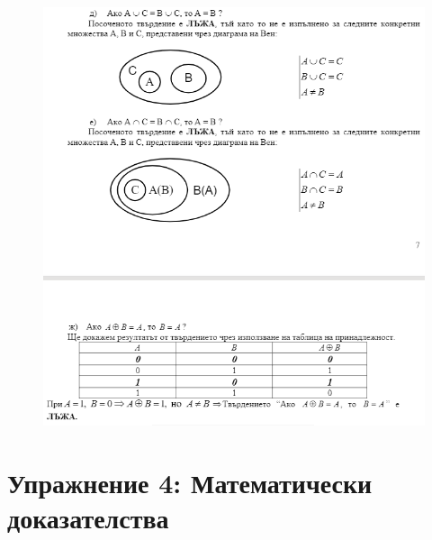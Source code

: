 \documentclass[fleqn, 12pt]{article}
\theoremstyle{definition}
\begin{document}
\begin{figure} 
\includegraphics{Pics/Discrete math/ex3/ex3-task10-2.png}
\end{figure}

\newpage
\section{Упражнение 4: Математически доказателства}
\end{document}
